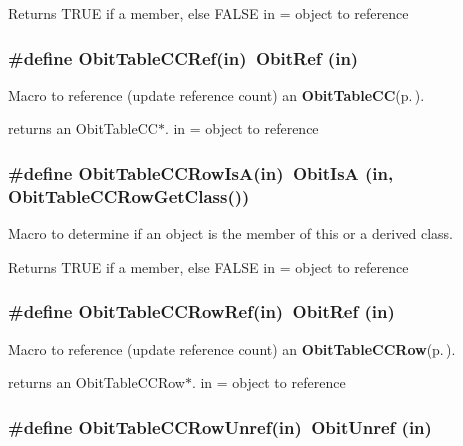 Returns TRUE if a member, else FALSE in = object to reference 
\subsubsection{\setlength{\rightskip}{0pt plus 5cm}\#define Obit\-Table\-CCRef(in)\ Obit\-Ref (in)}\label{ObitTableCC_8h_a2}


Macro to reference (update reference count) an {\bf Obit\-Table\-CC}{\rm (p.\,\pageref{structObitTableCC})}. 

returns an Obit\-Table\-CC$\ast$. in = object to reference 
\subsubsection{\setlength{\rightskip}{0pt plus 5cm}\#define Obit\-Table\-CCRow\-Is\-A(in)\ Obit\-Is\-A (in, Obit\-Table\-CCRow\-Get\-Class())}\label{ObitTableCC_8h_a6}


Macro to determine if an object is the member of this or a derived class. 

Returns TRUE if a member, else FALSE in = object to reference 
\subsubsection{\setlength{\rightskip}{0pt plus 5cm}\#define Obit\-Table\-CCRow\-Ref(in)\ Obit\-Ref (in)}\label{ObitTableCC_8h_a5}


Macro to reference (update reference count) an {\bf Obit\-Table\-CCRow}{\rm (p.\,\pageref{structObitTableCCRow})}. 

returns an Obit\-Table\-CCRow$\ast$. in = object to reference 
\subsubsection{\setlength{\rightskip}{0pt plus 5cm}\#define Obit\-Table\-CCRow\-Unref(in)\ Obit\-Unref (in)}\label{ObitTableCC_8h_a4}


